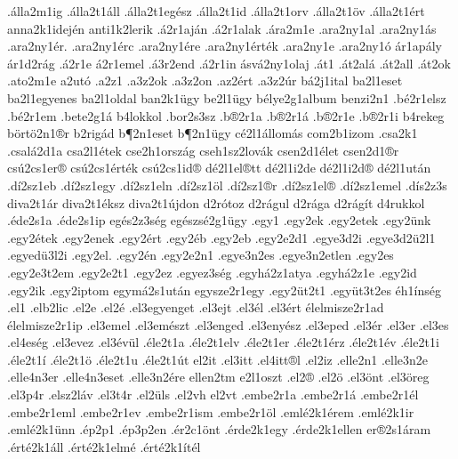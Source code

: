 {.^^e1lla2m1ig
.^^e1lla2t1^^e1ll
.^^e1lla2t1eg^^e9sz
.^^e1lla2t1id
.^^e1lla2t1orv
.^^e1lla2t1^^f6v
.^^e1lla2t1^^e9rt
anna2k1idej^^e9n
anti1k2lerik
.^^e12r1aj^^e1n
.^^e12r1alak
.^^e1ra2m1e
.ara2ny1al
.ara2ny1^^e1s
.ara2ny1^^e9r.
.ara2ny1^^e9rc
.ara2ny1^^e9re
.ara2ny1^^e9rt^^e9k
.ara2ny1e
.ara2ny1^^f3
^^e1r1ap^^e1ly
^^e1r1d2r^^e1g
.^^e12r1e
^^e12r1emel
.^^e13r2end
.^^e12r1in
^^e1sv^^e12ny1olaj
.^^e1t1
.^^e1t2al^^e1
.^^e1t2all
.^^e1t2ok
.ato2m1e
a2ut^^f3
.a2z1
.a3z2ok
.a3z2on
.az2^^e9rt
.a3z2^^far
b^^e12j1ital
ba2l1eset
ba2l1egyenes
ba2l1oldal
ban2k1^^fcgy
be2l1^^fcgy
b^^e9lye2g1album
benzi2n1
.b^^e92r1elsz
.b^^e92r1em
.bete2g1^^e1
b4lokkol
.bor2s3sz
.b^^ae2r1a
.b^^ae2r1^^e1
.b^^ae2r1e
.b^^ae2r1i
b4rekeg
b^^f6rt^^f62n1^^aer
b2rig^^e1d
b^^b62n1eset
b^^b62n1^^fcgy
c^^e92l1^^e1llom^^e1s
com2b1izom
.csa2k1
.csal^^e12d1a
csa2l1^^e9tek
cse2h1orsz^^e1g
cseh1sz2lov^^e1k
csen2d1^^e9let
csen2d1^^aer
cs^^fa2cs1er^^ae
cs^^fa2cs1^^e9rt^^e9k
cs^^fa2cs1id^^ae
d^^e92l1el^^aett
d^^e92l1i2de %
d^^e92l1i2d^^ae %
d^^e92l1ut^^e1n
.d^^ed2sz1eb
.d^^ed2sz1egy
.d^^ed2sz1eln
.d^^ed2sz1^^f6l
.d^^ed2sz1^^aer
.d^^ed2sz1el^^ae
.d^^ed2sz1emel
.d^^eds2z3s
diva2t1^^e1r
diva2t1^^e9ksz
diva2t1^^fajdon
d2r^^f3toz
d2r^^e1gul
d2r^^e1ga
d2r^^e1g^^edt
d4rukkol
.^^e9de2s1a
.^^e9de2s1ip
eg^^e9s2z3s^^e9g
eg^^e9szs^^e92g1^^fcgy
.egy1
.egy2ek
.egy2etek
.egy2^^fcnk
.egy2^^e9tek
.egy2enek
.egy2^^e9rt
.egy2^^e9b
.egy2eb
.egy2e2d1
.egye3d2i
.egye3d2^^fc2l1
.egyed^^fc3l2i
.egy2el.
.egy2^^e9n
.egy2e2n1
.egye3n2es
.egye3n2etlen
.egy2es
.egy2e3t2em
.egy2e2t1
.egy2ez
.egyez3s^^e9g
.egyh^^e12z1atya
.egyh^^e12z1e
.egy2id
.egy2ik
.egy2iptom
egym^^e12s1ut^^e1n
egysze2r1egy
.egy2^^fct2t1
.egy^^fct3t2es
^^e9h1^^edns^^e9g
.el1
.elb2lic
.el2e
.el2^^e9
.el3egyenget
.el3ejt
.el3^^e9l
.el3^^e9rt
^^e9lelmisze2r1ad
^^e9lelmisze2r1ip
.el3emel
.el3em^^e9szt
.el3enged
.el3eny^^e9sz
.el3eped
.el3^^e9r
.el3er
.el3es
.el4es^^e9g
.el3evez
.el3^^e9v^^fcl
.^^e9le2t1a
.^^e9le2t1elv
.^^e9le2t1er
.^^e9le2t1^^e9rz
.^^e9le2t1^^e9v
.^^e9le2t1i
.^^e9le2t1^^ed
.^^e9le2t1^^f6
.^^e9le2t1u
.^^e9le2t1^^fat
el2it
.el3itt
.el4itt^^ael
.el2iz
.elle2n1
.elle3n2e
.elle4n3er
.elle4n3eset
.elle3n2^^e9re
ellen2tm
e2l1oszt
.el2^^ae
.el2^^f6
.el3^^f6nt
.el3^^f6reg
.el3p4r
.elsz2l^^e1v
.el3t4r
.el2^^fcls       %
.el2vh        %
el2vt
.embe2r1a
.embe2r1^^e1
.embe2r1^^e9l
.embe2r1eml
.embe2r1ev
.embe2r1ism
.embe2r1^^f6l
.eml^^e92k1^^e9rem
.eml^^e92k1ir
.eml^^e92k1^^fcnn
.^^e9p2p1
.^^e9p3p2en
.^^e9r2c1^^f6nt
.^^e9rde2k1egy
.^^e9rde2k1ellen
er^^ae2s1^^e1ram
.^^e9rt^^e92k1^^e1ll
.^^e9rt^^e92k1elm^^e9
.^^e9rt^^e92k1^^edt^^e9l
}
